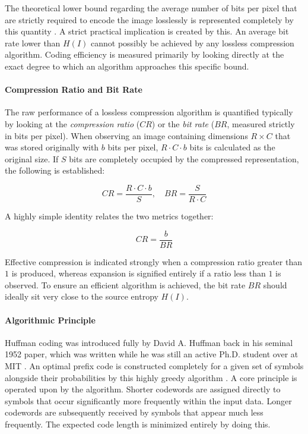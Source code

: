 The theoretical lower bound regarding the average number of bits per pixel that are strictly required to encode the image losslessly is represented completely by this quantity \cite{Salomon1997}. A strict practical implication is created by this. An average bit rate lower than $H(I)$ cannot possibly be achieved by any lossless compression algorithm. Coding efficiency is measured primarily by looking directly at the exact degree to which an algorithm approaches this specific bound.

\paragraph{Compression Ratio and Bit Rate}

The raw performance of a lossless compression algorithm is quantified typically by looking at the \textit{compression ratio} ($CR$) or the \textit{bit rate} ($BR$, measured strictly in bits per pixel). When observing an image containing dimensions $R \times C$ that was stored originally with $b$ bits per pixel, $R \cdot C \cdot b$ bits is calculated as the original size. If $S$ bits are completely occupied by the compressed representation, the following is established:

\begin{equation}
    CR = \frac{R \cdot C \cdot b}{S}, \quad BR = \frac{S}{R \cdot C}
\end{equation}

A highly simple identity relates the two metrics together:

\begin{equation}
    CR = \frac{b}{BR}
\end{equation}

Effective compression is indicated strongly when a compression ratio greater than $1$ is produced, whereas expansion is signified entirely if a ratio less than $1$ is observed. To ensure an efficient algorithm is achieved, the bit rate $BR$ should ideally sit very close to the source entropy $H(I)$.


\paragraph{Algorithmic Principle}

Huffman coding was introduced fully by David A. Huffman back in his seminal 1952 paper, which was written while he was still an active Ph.D. student over at MIT \cite{Huffman1952}. An optimal prefix code is constructed completely for a given set of symbols alongside their probabilities by this highly greedy algorithm \cite[Section IV-A]{Salomon1997}. A core principle is operated upon by the algorithm. Shorter codewords are assigned directly to symbols that occur significantly more frequently within the input data. Longer codewords are subsequently received by symbols that appear much less frequently. The expected code length is minimized entirely by doing this. \cite{Huffman1952}

